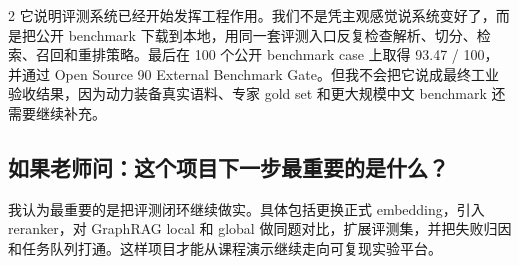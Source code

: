 \documentclass[10pt, a4paper]{ctexart}
\begin{document}
\begin{multicols}{2}
它说明评测系统已经开始发挥工程作用。我们不是凭主观感觉说系统变好了，而是把公开 benchmark 下载到本地，用同一套评测入口反复检查解析、切分、检索、召回和重排策略。最后在 100 个公开 benchmark case 上取得 93.47 / 100，并通过 Open Source 90 External Benchmark Gate。但我不会把它说成最终工业验收结果，因为动力装备真实语料、专家 gold set 和更大规模中文 benchmark 还需要继续补充。

\subsection*{如果老师问：这个项目下一步最重要的是什么？}


我认为最重要的是把评测闭环继续做实。具体包括更换正式 embedding，引入 reranker，对 GraphRAG local 和 global 做同题对比，扩展评测集，并把失败归因和任务队列打通。这样项目才能从课程演示继续走向可复现实验平台。
\end{multicols}
\end{document}
